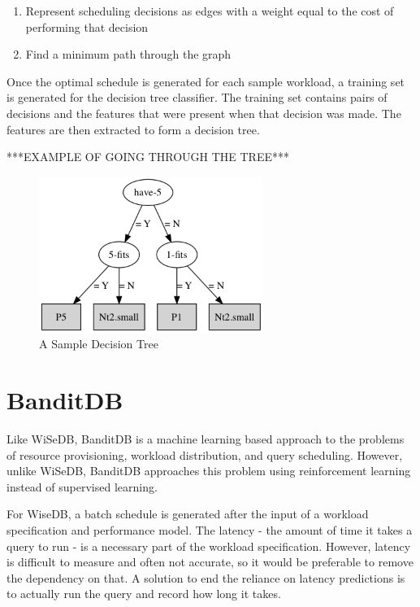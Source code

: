 \documentclass{brandiss}
\numberwithin{section}{chapter}
\numberwithin{figure}{chapter}
\theoremstyle{definition}
\theoremstyle{plain}
\theoremstyle{remark}
\begin{document}
\begin{enumerate}
\item Represent scheduling decisions as edges with a weight equal to the cost of performing that decision
\item Find a minimum path through the graph

\end{enumerate}

Once the optimal schedule is generated for each sample workload, a training set is generated for the decision tree classifier. The training set contains pairs of decisions and the features that were present when that decision was made. The features are then extracted to form a decision tree.

***EXAMPLE OF GOING THROUGH THE TREE***

\begin{figure}[htbp]
  \centering
  \includegraphics[height=2in]{dt1}
  \caption{A Sample Decision Tree}
  \label{fig:dt1}
\end{figure}

\chapter{BanditDB}

Like WiSeDB, BanditDB is a machine learning based approach to the problems of resource provisioning, workload distribution, and query scheduling. However, unlike WiSeDB, BanditDB approaches this problem using reinforcement learning instead of supervised learning.

For WiseDB, a batch schedule is generated after the input of a workload specification and performance model. The latency - the amount of time it takes a query to run - is a necessary part of the workload specification. However, latency is difficult to measure and often not accurate, so it would be preferable to remove the dependency on that. A solution to end the reliance on latency predictions is to actually run the query and record how long it takes.
\end{document}
